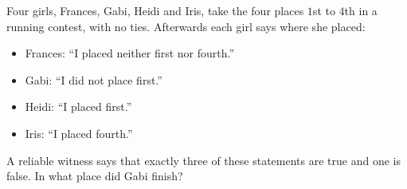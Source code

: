 Four girls, Frances, Gabi, Heidi and Iris, take the four places $1$st to $4$th in a running contest, with no ties. Afterwards each girl says where she placed:
\begin{itemize}
\item Frances: ``I placed neither first nor fourth.''
\item Gabi: ``I did not place first.''
\item Heidi: ``I placed first.''
\item Iris: ``I placed fourth.''
\end{itemize}
A reliable witness says that exactly three of these statements are true and one is false. In what place did Gabi finish?
